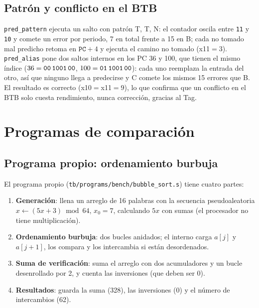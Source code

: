 \documentclass[12pt,a4paper]{article}
\newcommand{\sig}[1]{\texttt{#1}}
\begin{document}
\FloatBarrier
\subsection{Patrón y conflicto en el BTB}

\texttt{pred\_pattern} ejecuta un salto con patrón T, T, N: el contador oscila entre \texttt{11} y \texttt{10} y comete un error por periodo, 7 en total frente a 15 en B; cada no tomado mal predicho retoma en $\sig{PC}+4$ y ejecuta el camino no tomado (x11$=3$). \texttt{pred\_alias} pone dos saltos internos en los PC 36 y 100, que tienen el mismo índice ($36 = \texttt{00\,1001\,00}$, $100 = \texttt{01\,1001\,00}$): cada uno reemplaza la entrada del otro, así que ninguno llega a predecirse y C comete los mismos 15 errores que B. El resultado es correcto (x10$=$x11$=9$), lo que confirma que un conflicto en el BTB solo cuesta rendimiento, nunca corrección, gracias al Tag.

\section{Programas de comparación}
\label{sec:programas}

\subsection{Programa propio: ordenamiento burbuja}
\label{sec:propio}

El programa propio (\texttt{tb/programs/bench/bubble\_sort.s}) tiene cuatro partes:
\begin{enumerate}
    \item \textbf{Generación}: llena un arreglo de 16 palabras con la secuencia pseudoaleatoria $x \leftarrow (5x+3) \bmod 64$, $x_0 = 7$, calculando $5x$ con sumas (el procesador no tiene multiplicación).
    \item \textbf{Ordenamiento burbuja}: dos bucles anidados; el interno carga $a[j]$ y $a[j+1]$, los compara y los intercambia si están desordenados.
    \item \textbf{Suma de verificación}: suma el arreglo con dos acumuladores y un bucle desenrollado por 2, y cuenta las inversiones (que deben ser 0).
    \item \textbf{Resultados}: guarda la suma (328), las inversiones (0) y el número de intercambios (62).
\end{enumerate}
\end{document}
